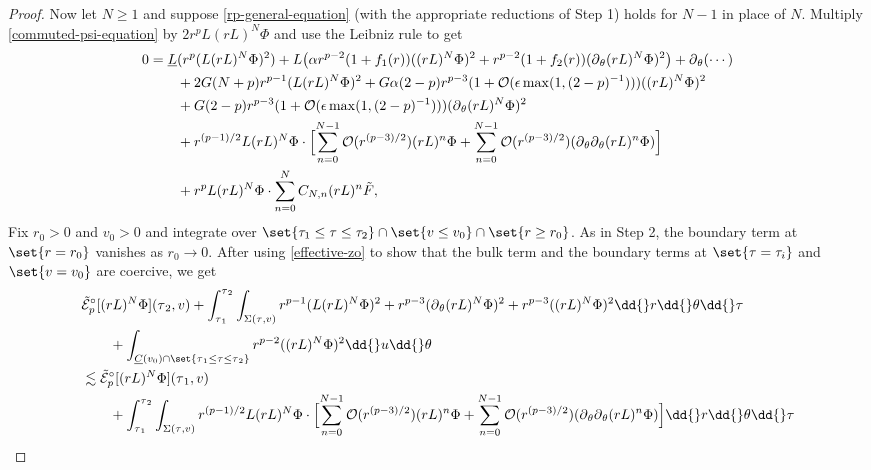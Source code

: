 \documentclass[10pt, reqno]{amsart}
\begin{document}
\begin{proof}
 Now let \(N\ge 1\) and suppose
\cref{rp-general-equation} (with the appropriate reductions of Step 1) holds for
\(N-1\) in place of \(N\). Multiply \cref{commuted-psi-equation} by
\(2r^pL(rL)^N\Phi{}\) and use the Leibniz rule to get
\begin{equation}
\begin{split}
0 &= \underline{L}(r^p(L(rL)^N\Phi{})^2) + L\bigl(\alpha{}r^{p-2}(1+f_1(r))((rL)^N\Phi{})^2 + r^{p-2}(1+f_2(r))(\partial{}_\theta{}(rL)^N\Phi{})^2\bigr)  + \partial{}_\theta{}(\cdots{}) \\
&\qquad + 2G(N+p)r^{p-1}(L(rL)^N\Phi{})^2 + G\alpha{}(2-p)r^{p-3}(1 + \mathcal{O}(\epsilon{}\max (1,(2-p)^{-1})))((rL)^N\Phi{})^2 \\
&\qquad + G(2-p)r^{p-3}(1 + \mathcal{O}(\epsilon{}\max (1,(2-p)^{-1})))(\partial{}_\theta{}(rL)^N\Phi{})^2 \\
&\qquad + r^{(p-1)/2}L(rL)^N\Phi{}\cdot \Bigl[\sum_{n=0}^{N-1}\mathcal{O}(r^{(p-3)/2})(rL)^n\Phi{} + \sum_{n=0}^{N-1} \mathcal{O}(r^{(p-3)/2})(\partial{}_\theta{}\partial{}_\theta{}(rL)^n\Phi{})\Bigr] \\
&\qquad + r^pL(rL)^N\Phi{}\cdot \sum_{n=0}^NC_{N,n}(rL)^n\tilde{F},
\end{split}
\end{equation}
Fix \(r_0>0\) and \(v_0 > 0\) and integrate over \(\set{\tau_1\le \tau{}\le \tau_2}\cap
\set{v\le v_0}\cap \set{r\ge r_0}\). As in Step 2, the boundary term at
\(\set{r=r_0}\) vanishes as \(r_0\to 0\). After using
\cref{effective-zo} to show that the bulk term and the boundary terms at
\(\set{\tau{}=\tau_i}\) and \(\set{v=v_0}\) are coercive, we get
\begin{equation}\label{rp-prelim-inequality}
\begin{split}
&\tilde{\mathcal{E}}_p^{\circ }[(rL)^N\Phi{}](\tau{}_2,v) + \int_{\tau{}_1}^{\tau{}_2} \int _{\Sigma{}(\tau{},v)} r^{p-1}(L(rL)^N\Phi{})^2 + r^{p-3}(\partial{}_\theta{}(rL)^N\Phi{})^2 + r^{p-3}((rL)^N\Phi{})^2 \dd{}r\dd{}\theta{}\dd{}\tau{}\\
&\qquad + \int _{\underline{C}(v_0)\cap \set{\tau{}_1\le \tau{}\le \tau{}_2}}r^{p-2}((rL)^N\Phi)^2\dd{}u\dd{}\theta{} \\
&\lesssim \tilde{\mathcal{E}}_p^{\circ }[(rL)^N\Phi{}](\tau{}_1,v) \\
&\qquad +  \int_{\tau{}_1}^{\tau{}_2} \int _{\Sigma{}(\tau{},v)} r^{(p-1)/2}L(rL)^N\Phi{}\cdot \Bigl[\sum_{n=0}^{N-1}\mathcal{O}(r^{(p-3)/2})(rL)^n\Phi{} + \sum_{n=0}^{N-1} \mathcal{O}(r^{(p-3)/2})(\partial{}_\theta{}\partial{}_\theta{}(rL)^n\Phi{})\Bigr]\dd{}r\dd{}\theta{}\dd{}\tau{} \\

\end{split}
\end{equation}
\end{proof}
\end{document}
